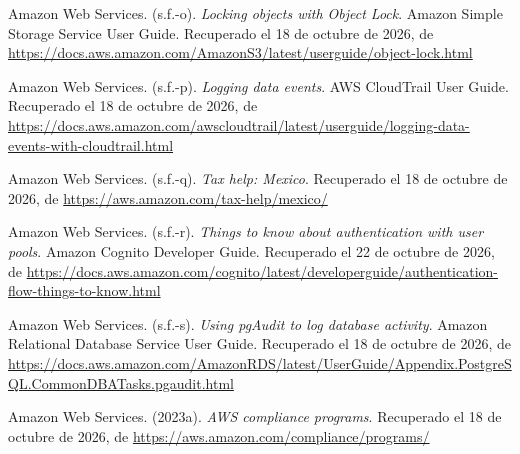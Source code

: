 \documentclass[12pt, a4paper]{article}
\begin{document}
\begin{list}{}{\setlength{\leftmargin}{1.27cm}\setlength{\itemindent}{-1.27cm}%
  \setlength{\labelwidth}{0pt}\setlength{\labelsep}{0pt}\setlength{\itemsep}{6pt}}
 
\item Amazon Web Services. (s.f.-o). \textit{Locking objects with
  Object Lock}. Amazon Simple Storage Service User Guide. Recuperado el 18 de octubre de 2026, de \url{https://docs.aws.amazon.com/AmazonS3/latest/userguide/object-lock.html}
 
 
\item Amazon Web Services. (s.f.-p). \textit{Logging data events}.
  AWS CloudTrail User Guide. Recuperado el 18 de octubre de 2026, de \url{https://docs.aws.amazon.com/awscloudtrail/latest/userguide/logging-data-events-with-cloudtrail.html}
 
 
\item Amazon Web Services. (s.f.-q). \textit{Tax help: Mexico}. Recuperado el 18 de octubre de 2026, de \url{https://aws.amazon.com/tax-help/mexico/}
 
 
\item Amazon Web Services. (s.f.-r). \textit{Things to know about
  authentication with user pools}. Amazon Cognito Developer Guide. Recuperado el 22 de octubre de 2026, de \url{https://docs.aws.amazon.com/cognito/latest/developerguide/authentication-flow-things-to-know.html}
 
 
\item Amazon Web Services. (s.f.-s). \textit{Using pgAudit to log
  database activity}. Amazon Relational Database Service User Guide. Recuperado el 18 de octubre de 2026, de \url{https://docs.aws.amazon.com/AmazonRDS/latest/UserGuide/Appendix.PostgreSQL.CommonDBATasks.pgaudit.html}
 

\item Amazon Web Services. (2023a). \textit{AWS compliance programs}. Recuperado el 18 de octubre de 2026, de \url{https://aws.amazon.com/compliance/programs/}


\end{list}
\end{document}
